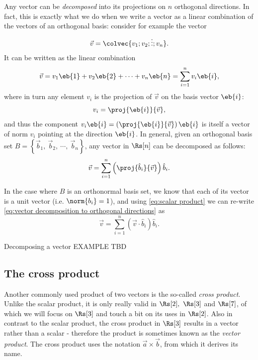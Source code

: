 Any vector can be \emph{decomposed} into its projections on $n$ orthogonal directions. In fact, this is exactly what we do when we write a vector as a linear combination of the vectors of an orthogonal basis: consider for example the vector
\[
	\vec{v} = \colvec{v_{1};v_{2};\vdots;v_{n}}.
\]
It can be written as the linear combination
\[
	\vec{v} = v_{1}\eb{1} + v_{2}\eb{2} + \cdots + v_{n}\eb{n} = \sum\limits_{i=1}^{n}v_{i}\eb{i},
\]
where in turn any element $v_{i}$ is the projection of $\vec{v}$ on the basis vector $\eb{i}$:
\begin{equation}
	v_{i} = \proj{\eb{i}}{\vec{v}},
	\label{eq:}
\end{equation}
and thus the component $v_{i}\eb{i}=\left(\proj{\eb{i}}{\vec{v}}\right)\eb{i}$ is itself a vector of norm $v_{i}$ pointing at the direction $\eb{i}$. In general, given an orthogonal basis set $B=\left\{ \vec{b}_{1},\ \vec{b}_{2},\ \cdots,\ \vec{b}_{n} \right\}$, any vector in $\Rs[n]$ can be decomposed as follows:
\begin{equation}
	\vec{v} = \sum\limits_{i=1}^{n}\left(\proj{\hat{b}_{i}}{\vec{v}}\right)\hat{b}_{i}.
	\label{eq:vector decomposition to orthogonal directions}
\end{equation}

In the case where $B$ is an orthonormal basis set, we know that each of its vector is a unit vector (i.e. $\norm{b_{i}}=1$), and using \autoref{eq:scalar product} we can re-write \autoref{eq:vector decomposition to orthogonal directions} as
\begin{equation}
	\vec{v} = \sum\limits_{i=1}^{n}\left( \vec{v}\cdot\hat{b}_{i} \right)\hat{b}_{i}.
	\label{eq:vector decomposition in orthonormal basis set}
\end{equation}

\begin{example}{Decomposing a vector}{}
	EXAMPLE TBD
\end{example}


\subsection{The cross product}
Another commonly used product of two vectors is the so-called \emph{cross product}. Unlike the scalar product, it is only really valid in $\Rs[2],\ \Rs[3]$ and $\Rs[7]$, of which we will focus on $\Rs[3]$ and touch a bit on its uses in $\Rs[2]$. Also in contrast to the scalar product, the cross product in $\Rs[3]$ results in a vector rather than a scalar - therefore the product is sometimes known as the \emph{vector product}. The cross product uses the notation $\vec{a}\times\vec{b}$, from which it derives its name.

